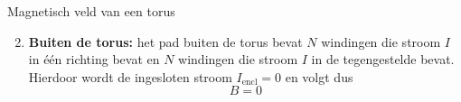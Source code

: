 \begin{app}{Magnetisch veld van een torus}
\begin{minipage}{.23\textwidth}
    \end{minipage}
    \begin{enumerate}
        \setcounter{enumi}{1}
        \item \textbf{Buiten de torus:} het pad buiten de torus bevat $N$ windingen die stroom $I$ in één richting bevat en $N$ windingen
        die stroom $I$ in de tegengestelde bevat. Hierdoor wordt de ingesloten stroom $I_{\text{encl}} = 0$ en volgt dus
        \begin{equation*}
            B = 0
        \end{equation*}
    \end{enumerate}
\end{app}

\newpage

